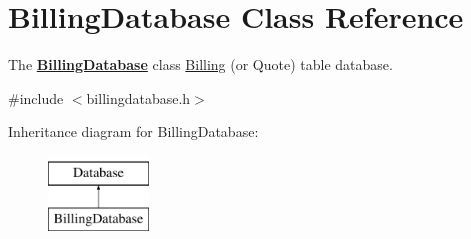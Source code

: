 \hypertarget{classBillingDatabase}{\section{Billing\+Database Class Reference}
\label{classBillingDatabase}
}


The {\bfseries \hyperlink{classBillingDatabase}{Billing\+Database}} class \hyperlink{classBilling}{Billing} (or Quote) table database.  




{\ttfamily \#include $<$billingdatabase.\+h$>$}

Inheritance diagram for Billing\+Database\+:\begin{figure}[H]
\begin{center}
\leavevmode
\includegraphics[height=2.000000cm]{d0/dad/classBillingDatabase}
\end{center}
\end{figure}
